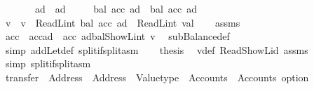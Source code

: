\begin{isabellebody}
\ \ \ \ \ \ \ {\isachardoublequoteopen}ad\ {\isasymnoteq}\ ad{\isacharprime}{\kern0pt}{\isachardoublequoteclose}\isanewline
\ \ \ \ \ {\isachardoublequoteopen}{\isacharparenleft}{\kern0pt}bal\ {\isacharparenleft}{\kern0pt}acc\ ad{\isacharprime}{\kern0pt}{\isacharparenright}{\kern0pt}{\isacharparenright}{\kern0pt}\ {\isacharequal}{\kern0pt}\ {\isacharparenleft}{\kern0pt}bal\ {\isacharparenleft}{\kern0pt}acc{\isacharprime}{\kern0pt}\ ad{\isacharprime}{\kern0pt}{\isacharparenright}{\kern0pt}{\isacharparenright}{\kern0pt}{\isachardoublequoteclose}\isanewline
%
\isadelimproof
%
\endisadelimproof
%
\isatagproof
{}\isamarkupfalse%
\ {\isacharminus}{\kern0pt}\isanewline
\ \ \isamarkupfalse%
\ v\ \ {\isachardoublequoteopen}v\ {\isacharequal}{\kern0pt}\ ReadL\isactrlsub i\isactrlsub n\isactrlsub t\ {\isacharparenleft}{\kern0pt}bal\ {\isacharparenleft}{\kern0pt}acc\ ad{\isacharparenright}{\kern0pt}{\isacharparenright}{\kern0pt}\ {\isacharminus}{\kern0pt}\ ReadL\isactrlsub i\isactrlsub n\isactrlsub t\ val{\isachardoublequoteclose}\isanewline
\ \ \isamarkupfalse%
\ assms\ \isamarkupfalse%
\ {\isachardoublequoteopen}acc{\isacharprime}{\kern0pt}\ {\isacharequal}{\kern0pt}\ acc{\isacharparenleft}{\kern0pt}ad\ {\isacharcolon}{\kern0pt}{\isacharequal}{\kern0pt}\ acc\ ad{\isasymlparr}bal{\isacharcolon}{\kern0pt}{\isacharequal}{\kern0pt}ShowL\isactrlsub i\isactrlsub n\isactrlsub t\ v{\isasymrparr}{\isacharparenright}{\kern0pt}{\isachardoublequoteclose}\ \isamarkupfalse%
\ subBalance{\isacharunderscore}{\kern0pt}def\ \isamarkupfalse%
\ {\isacharparenleft}{\kern0pt}simp\ add{\isacharcolon}{\kern0pt}Let{\isacharunderscore}{\kern0pt}def\ split{\isacharcolon}{\kern0pt}if{\isacharunderscore}{\kern0pt}split{\isacharunderscore}{\kern0pt}asm{\isacharparenright}{\kern0pt}\isanewline
\ \ \isamarkupfalse%
\ {\isacharquery}{\kern0pt}thesis\ \isamarkupfalse%
\ v{\isacharunderscore}{\kern0pt}def\ Read{\isacharunderscore}{\kern0pt}ShowL{\isacharunderscore}{\kern0pt}id\ assms\ \isamarkupfalse%
\ {\isacharparenleft}{\kern0pt}simp\ split{\isacharcolon}{\kern0pt}if{\isacharunderscore}{\kern0pt}split{\isacharunderscore}{\kern0pt}asm{\isacharparenright}{\kern0pt}\isanewline
{}\isamarkupfalse%
%
\endisatagproof
{\isafoldproof}%
%
\isadelimproof
\isanewline
%
\endisadelimproof
\isanewline
{}\isamarkupfalse%
\ transfer\ {\isacharcolon}{\kern0pt}{\isacharcolon}{\kern0pt}\ {\isachardoublequoteopen}Address\ {\isasymRightarrow}\ Address\ {\isasymRightarrow}\ Valuetype\ {\isasymRightarrow}\ Accounts\ {\isasymRightarrow}\ Accounts\ option{\isachardoublequoteclose}\isanewline

\end{isabellebody}

